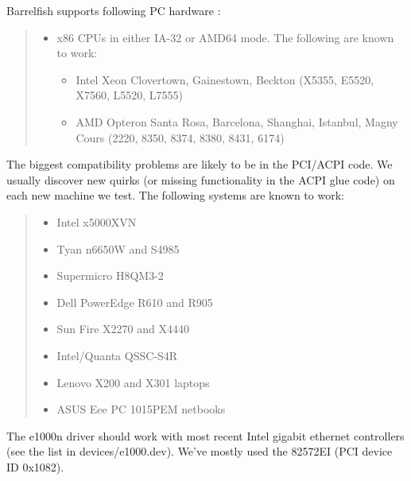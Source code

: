 Barrelfish supports following PC hardware :
%
\begin{quote}
%
\begin{itemize}

\item x86 CPUs in either IA-32 or AMD64 mode. The following are known to work:
%
\begin{itemize}

\item Intel Xeon Clovertown, Gainestown, Beckton (X5355, E5520, X7560, L5520,
L7555)

\item AMD Opteron Santa Rosa, Barcelona, Shanghai, Istanbul, Magny Cours
(2220, 8350, 8374, 8380, 8431, 6174)

\end{itemize}

\end{itemize}

\end{quote}

The biggest compatibility problems are likely to be in the PCI/ACPI code. We
usually discover new quirks (or missing functionality in the ACPI glue code)
on each new machine we test. The following systems are known to work:
%
\begin{quote}
%
\begin{itemize}

\item Intel x5000XVN

\item Tyan n6650W and S4985

\item Supermicro H8QM3-2

\item Dell PowerEdge R610 and R905

\item Sun Fire X2270 and X4440

\item Intel/Quanta QSSC-S4R

\item Lenovo X200 and X301 laptops

\item ASUS Eee PC 1015PEM netbooks

\end{itemize}

\end{quote}

The e1000n driver should work with most recent Intel gigabit ethernet
controllers (see the list in devices/e1000.dev). We've mostly used the
82572EI (PCI device ID 0x1082).


